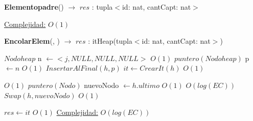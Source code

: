 \begin{Algoritmos}
\begin{algorithm}[H]{\textbf{Elementopadre}() $\to$ $res$ : tupla$<$id: nat, cantCapt: nat$>$}
\begin{algorithmic}[1]
			\medskip
			\Statex \underline{Complejidad:} $O(1)$
    	\end{algorithmic}   	
\end{algorithm}

\begin{algorithm}[H]{\textbf{EncolarElem}(, ) $\to$ $res$ : itHeap(tupla$<$id: nat, cantCapt: nat$>$)}
    	\begin{algorithmic}[1]
    	\State $Nodoheap$ n $\gets <j, NULL, NULL, NULL>$ \Comment $O(1)$
    	\State $puntero(Nodoheap)$ p $\gets n$  \Comment $O(1)$
		\State $InsertarAlFinal(h, p)$
		\State $it \gets CrearIt(h)$ \Comment $O(1)$

		 \Comment $O(1)$
			\State $puntero(Nodo)$ nuevoNodo $\gets h.ultimo$			\Comment $O(1)$
			 \Comment $O(log(EC))$
				\State $Swap(h, nuevoNodo)$ \Comment $O(1)$
						
			\EndWhile
		\EndIf
		\State $res \gets it$ \Comment $O(1)$
			\medskip
			\Statex \underline{Complejidad:} $O(log(EC))$
    	\end{algorithmic}   	
\end{algorithm}


\end{Algoritmos}
